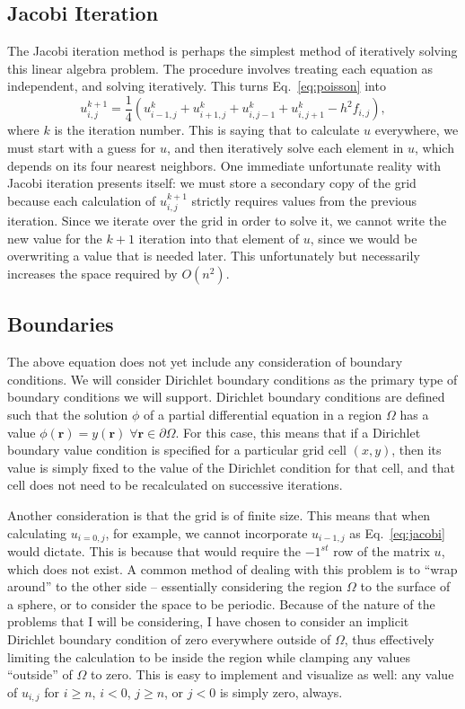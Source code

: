 \subsection{Jacobi Iteration}
The Jacobi iteration method is perhaps the simplest method of iteratively solving this linear algebra problem. The procedure
involves treating each equation as independent, and solving iteratively. This turns Eq.~\ref{eq:poisson} into\cite{poisson-relax}
\begin{equation} \label{eq:jacobi}
u_{i,j}^{k+1} = \frac{1}{4}(u_{i-1,j}^{k} + u_{i+1,j}^{k} + u_{i,j-1}^{k} + u_{i,j+1}^{k} - h^2f_{i,j}),
\end{equation}
where $k$ is the iteration number. This is saying that to calculate $u$ everywhere, we must start with a guess for $u$,
and then iteratively solve each element in $u$, which depends on its four nearest neighbors. One immediate unfortunate
reality with Jacobi iteration presents itself: we must store a secondary copy of the grid because each calculation
of $u_{i,j}^{k+1}$ strictly requires values from the previous iteration. Since we iterate over the grid in order to solve
it, we cannot write the new value for the $k+1$ iteration into that element of $u$, since we would be overwriting a value
that is needed later. This unfortunately but necessarily increases the space required by $O(n^2)$.

\subsection{Boundaries}

The above equation does not yet include any consideration of boundary conditions. We will consider Dirichlet boundary
conditions as the primary type of boundary conditions we will support.
Dirichlet boundary conditions are defined such that the solution $\phi$ of a partial
differential equation in a region $\Omega$ has a value $\phi(\mathbf{r}) = y(\mathbf{r}) \; \forall \mathbf{r} \in \partial \Omega$.
For this case, this means that if a Dirichlet boundary value condition is specified for a particular grid cell $(x,y)$,
then its value is simply fixed to the value of the Dirichlet condition for that cell, and that cell does not need to be recalculated on
successive iterations.

Another consideration is that the grid is of finite size. This means that when calculating $u_{i=0,j}$, for example, we cannot
incorporate $u_{i-1,j}$ as Eq.~\ref{eq:jacobi} would dictate. This is because that would require the $-1^{st}$ row of
the matrix $u$, which does not exist. A common method of dealing with this problem is to ``wrap around'' to the other side --
essentially considering the region $\Omega$ to the surface of a sphere, or to consider the space to be periodic. Because of
the nature of the problems that I will be considering, I have chosen to consider an implicit Dirichlet boundary condition
of zero everywhere outside of $\Omega$, thus effectively limiting the calculation to be inside the region while clamping any
values ``outside'' of $\Omega$ to zero. This is easy to implement and visualize as well: any value of $u_{i,j}$ for $i \geq n$,
$i < 0$, $j \geq n$, or $j < 0$ is simply zero, always.


